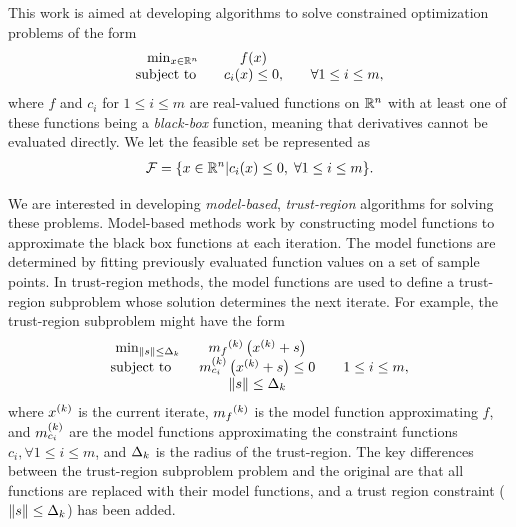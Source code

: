 \documentclass{article}
\begin{document}
This work is aimed at developing algorithms to solve constrained optimization problems of the form 
\begin{align}
\begin{array}{ccl} \min_{x \in \mathbb R^n} & f(x) \\
\mbox{subject to} \quad & c_i(x) \le 0, &\quad \forall 1 \le i \le m,
\end{array}
\label{the_dfo_problem}
\end{align}
where 
$f$ and $c_i$ for $1 \le i \le m$ are real-valued functions on $\mathbb R^n$ with at least one of these functions being a {\em black-box} function, meaning that derivatives cannot be evaluated directly.
We let the feasible set be represented as
\begin{align}
{\mathcal F} = \{x \in \mathbb R^n | c_i(x) \le 0, \; \forall 1 \le i \le m \}.
\end{align}

We are interested in developing {\em model-based}, {\em trust-region} algorithms for solving these problems.
Model-based methods work by constructing model functions to approximate the black box functions at each iteration.
The model functions are determined by fitting previously evaluated function values on a set of sample points.
In trust-region methods, the model functions are used to define a trust-region subproblem whose solution determines the next iterate.
For example, the trust-region subproblem might have the form
\begin{align*}
\begin{array}{ccl} \min_{\|s\| \le \Delta_k}
 & {{m}_f}^{(k)} \left(x^{(k)}+s\right) \\
\mbox{subject to} \quad & {{m}^{(k)}_{c_i}}\left(x^{(k)} + s\right) \le 0 & \quad 1 \le i \le m, \\
& \|s\| \le \Delta_k \\
\end{array}
\end{align*}
where $x^{(k)}$ is the current iterate, ${{m}_f}^{(k)}$ is the model function approximating $f$, 
and ${{m}^{(k)}_{c_i}}$ are the model functions approximating the constraint functions $c_i, \forall 1 \le i \le m$, and $\Delta_k$ is the radius of the trust-region.
The key differences between the trust-region subproblem problem and the original are that all functions are replaced with their model functions, 
and a trust region constraint ($\|s\| \le \Delta_k$) has been added.

\end{document}
